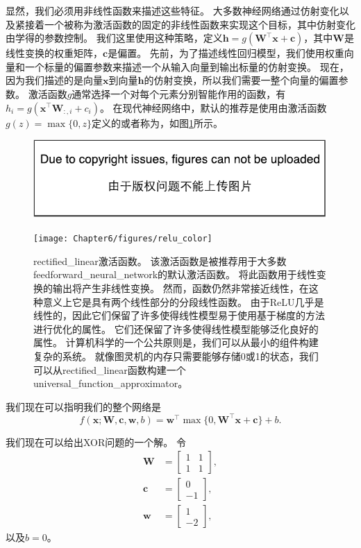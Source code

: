 显然，我们必须用非线性函数来描述这些特征。
大多数神经网络通过仿射变化以及紧接着一个被称为激活函数的固定的非线性函数来实现这个目标，其中仿射变化由学得的参数控制。
我们这里使用这种策略，定义$\bm{h}=g(\bm{W}^\top \bm{x}+\bm{c})$，其中$\bm{W}$是线性变换的权重矩阵，$\bm{c}$是偏置。
先前，为了描述线性回归模型，我们使用权重向量和一个标量的偏置参数来描述一个从输入向量到输出标量的仿射变换。
现在，因为我们描述的是向量$\bm{x}$到向量$\bm{h}$的仿射变换，所以我们需要一整个向量的偏置参数。
激活函数$g$通常选择一个对每个元素分别智能作用的函数，有$h_i =g(\bm{x}^\top \bm{W}_{:, i} + c_i)$。
在现代神经网络中，默认的推荐是使用由激活函数$g(z)=\max\{0, z\}$定义的或者称为\citep{Jarrett-ICCV2009-small,Nair-2010-small,Glorot+al-AI-2011-small}，如图\ref{fig:chap6_relu_color}所示。
\begin{figure}[!htb]
\ifOpenSource
\centerline{\includegraphics{figure.pdf}}
\else
\centerline{\texttt{[image: Chapter6/figures/relu\_color]}}
\fi
\caption{\gls{rectified_linear}激活函数。
该激活函数是被推荐用于大多数\gls{feedforward_neural_network}的默认激活函数。
将此函数用于线性变换的输出将产生非线性变换。 然而，函数仍然非常接近线性，在这种意义上它是具有两个线性部分的分段线性函数。
由于\gls{ReLU}几乎是线性的，因此它们保留了许多使得线性模型易于使用基于梯度的方法进行优化的属性。 它们还保留了许多使得线性模型能够泛化良好的属性。 计算机科学的一个公共原则是，我们可以从最小的组件构建复杂的系统。
就像图灵机的内存只需要能够存储0或1的状态，我们可以从\gls{rectified_linear}函数构建一个\gls{universal_function_approximator}。}
\label{fig:chap6_relu_color}
\end{figure}


我们现在可以指明我们的整个网络是
\begin{equation}
f(\bm{x}; \bm{W}, \bm{c}, \bm{w}, b) = \bm{w}^\top \max\{ 0, \bm{W}^\top \bm{x} + \bm{c} \} +b.
\end{equation}



我们现在可以给出XOR问题的一个解。
令
\begin{align}
\bm{W} &= \begin{bmatrix}
1 & 1\\
1 & 1
\end{bmatrix},\\
\bm{c} &= \begin{bmatrix}
0\\
-1
\end{bmatrix},\\
\bm{w} &= \begin{bmatrix}
1\\
-2
\end{bmatrix},
\end{align}
以及$b=0$。

